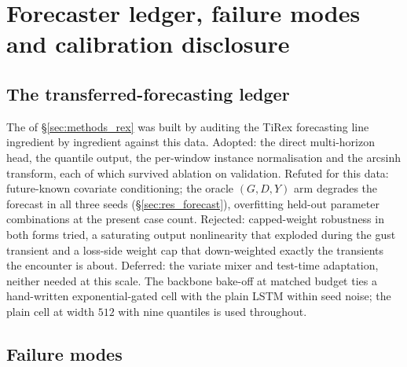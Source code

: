 
\section{Forecaster ledger, failure modes and calibration disclosure}

\subsection{The transferred-forecasting ledger}
\label{app:rex_ledger}

The \DirectFC{} of \S\ref{sec:methods_rex} was built by auditing the
TiRex forecasting line \citep{tirex,tirex2} ingredient by ingredient against this
data. Adopted: the direct multi-horizon head, the quantile output, the
per-window instance normalisation and the arcsinh transform, each of which
survived ablation on validation. Refuted for this data: future-known
covariate conditioning; the oracle $(G, D, Y)$ arm degrades the forecast
in all three seeds (\S\ref{sec:res_forecast}), overfitting held-out
parameter combinations at the present case count. Rejected: capped-weight
robustness in both forms tried, a saturating output nonlinearity that
exploded during the gust transient and a loss-side weight cap that
down-weighted exactly the transients the encounter is about. Deferred:
the variate mixer and test-time adaptation, neither needed at this scale.
The backbone bake-off at matched budget ties a hand-written
exponential-gated cell \citep{xlstm} with the plain LSTM within seed
noise; the plain cell at width $512$ with nine quantiles is used
throughout.

\subsection{Failure modes}
\label{app:failure_modes}

